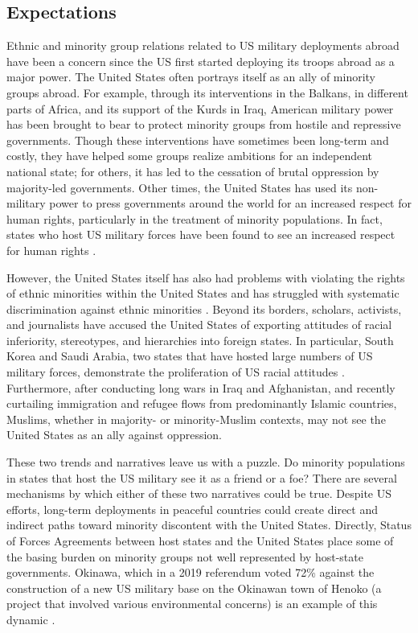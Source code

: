 \subsection*{Expectations}
 
Ethnic and minority group relations related to US military deployments abroad have been a concern since the US first started deploying its troops abroad as a major power. The United States often portrays itself as an ally of minority groups abroad. For example, through its interventions in the Balkans, in different parts of Africa, and its support of the Kurds in Iraq, American military power has been brought to bear to protect minority groups from hostile and repressive governments. Though these interventions have sometimes been long-term and costly, they have helped some groups realize ambitions for an independent national state; for others, it has led to the cessation of brutal oppression by majority-led governments. Other times, the United States has used its non-military power to press governments around the world for an increased respect for human rights, particularly in the treatment of minority populations. In fact, states who host US military forces have been found to see an increased respect for human rights \cite{bell2017}.

However, the United States itself has also had problems with violating the rights of ethnic minorities within the United States and has struggled with systematic discrimination against ethnic minorities \cite{Williamson2018}. Beyond its borders, scholars, activists, and journalists have accused the United States of exporting attitudes of racial inferiority, stereotypes, and hierarchies into foreign states. In particular, South Korea and Saudi Arabia, two states that have hosted large numbers of US military forces, demonstrate the proliferation of US racial attitudes \cite{Moon1997,Vitalis2007}. Furthermore, after conducting long wars in Iraq and Afghanistan, and recently curtailing immigration and refugee flows from predominantly Islamic countries, Muslims, whether in majority- or minority-Muslim contexts, may not see the United States as an ally against oppression. 
 
These two trends and narratives leave us with a puzzle. Do minority populations in states that host the US military see it as a friend or a foe? There are several mechanisms by which either of these two narratives could be true. Despite US efforts, long-term deployments in peaceful countries could create direct and indirect paths toward minority discontent with the United States. Directly, Status of Forces Agreements between host states and the United States place some of the basing burden on minority groups not well represented by host-state governments. Okinawa, which in a 2019 referendum voted 72\% against the construction of a new US military base on the Okinawan town of Henoko (a project that involved various environmental concerns) is an example of this dynamic \cite{tokyoone20200427,McCurry2019}.  

